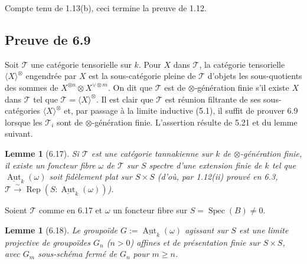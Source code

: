 \documentclass[12pt,a4paper]{article}
\theoremstyle{plain}
\newtheorem{lemma}[theorem]{Lemme}
\theoremstyle{definition}
\DeclareMathOperator{\Spec}{Spec}
\DeclareMathOperator{\Aut}{Aut}
\DeclareMathOperator{\Rep}{Rep}
\begin{document}
Compte tenu de 1.13(b), ceci termine la preuve de 1.12.

\subsection{Preuve de 6.9}

Soit $\mathcal{T}$ une catégorie tensorielle sur $k$. Pour $X$ dans $\mathcal{T}$, la catégorie tensorielle $\langle X \rangle^\otimes$ engendrée par $X$ est la sous-catégorie pleine de $\mathcal{T}$ d'objets les sous-quotients des sommes de $X^{\otimes n} \otimes X^{\vee \otimes m}$. On dit que $\mathcal{T}$ est de $\otimes$-génération finie s'il existe $X$ dans $\mathcal{T}$ tel que $\mathcal{T} = \langle X \rangle^\otimes$. Il est clair que $\mathcal{T}$ est réunion filtrante de ses sous-catégories $\langle X \rangle^\otimes$ et, par passage à la limite inductive (5.1), il suffit de prouver 6.9 lorsque les $\mathcal{T}_i$ sont de $\otimes$-génération finie. L'assertion résulte de 5.21 et du lemme suivant.

\begin{lemma}[6.17]
Si $\mathcal{T}$ est une catégorie tannakienne sur $k$ de $\otimes$-génération finie, il existe un foncteur fibre $\omega$ de $\mathcal{T}$ sur $S$ spectre d'une extension finie de $k$ tel que $\underline{\Aut}_k(\omega)$ soit fidèlement plat sur $S \times S$ (d'où, par 1.12(ii) prouvé en 6.3, $\mathcal{T} \xrightarrow{\sim} \Rep(S : \underline{\Aut}_k(\omega))$).
\end{lemma}

Soient $\mathcal{T}$ comme en 6.17 et $\omega$ un foncteur fibre sur $S = \Spec(B) \neq 0$.

\begin{lemma}[6.18]
Le groupoïde $G := \underline{\Aut}_k(\omega)$ agissant sur $S$ est une limite projective de groupoïdes $G_n$ ($n > 0$) affines et de présentation finie sur $S \times S$, avec $G_m$ sous-schéma fermé de $G_n$ pour $m \geq n$.
\end{lemma}
\end{document}
